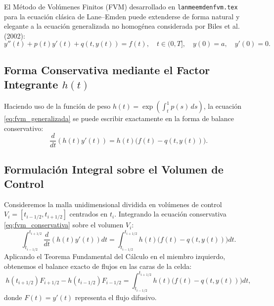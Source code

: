 \documentclass[12pt,a4paper]{article}
\begin{document}
El Método de Volúmenes Finitos (FVM) desarrollado en \texttt{lanmeemdenfvm.tex} para la ecuación clásica de Lane--Emden puede extenderse de forma natural y elegante a la ecuación generalizada no homogénea considerada por Biles et al. (2002):
\begin{equation} \label{eq:fvm_generalizada}
y''(t) + p(t) y'(t) + q(t, y(t)) = f(t), \quad t \in (0, T], \quad y(0) = a, \quad y'(0) = 0.
\end{equation}

\subsection{Forma Conservativa mediante el Factor Integrante $h(t)$}
Haciendo uso de la función de peso $h(t) = \exp\left( \int_t^1 p(s) \, ds \right)$, la ecuación \eqref{eq:fvm_generalizada} se puede escribir exactamente en la forma de balance conservativo:
\begin{equation} \label{eq:fvm_conservativa}
\frac{d}{dt} \left( h(t) y'(t) \right) = h(t) \Big( f(t) - q(t, y(t)) \Big).
\end{equation}

\subsection{Formulación Integral sobre el Volumen de Control}
Consideremos la malla unidimensional dividida en volúmenes de control $V_i = [t_{i-1/2}, t_{i+1/2}]$ centrados en $t_i$. Integrando la ecuación conservativa \eqref{eq:fvm_conservativa} sobre el volumen $V_i$:
\[
\int_{t_{i-1/2}}^{t_{i+1/2}} \frac{d}{dt} \left( h(t) y'(t) \right) dt = \int_{t_{i-1/2}}^{t_{i+1/2}} h(t) \Big( f(t) - q(t, y(t)) \Big) dt.
\]
Aplicando el Teorema Fundamental del Cálculo en el miembro izquierdo, obtenemos el balance exacto de flujos en las caras de la celda:
\begin{equation} \label{eq:balance_flujos}
h(t_{i+1/2}) F_{i+1/2} - h(t_{i-1/2}) F_{i-1/2} = \int_{t_{i-1/2}}^{t_{i+1/2}} h(t) \Big( f(t) - q(t, y(t)) \Big) dt,
\end{equation}
donde $F(t) = y'(t)$ representa el flujo difusivo.
\end{document}
